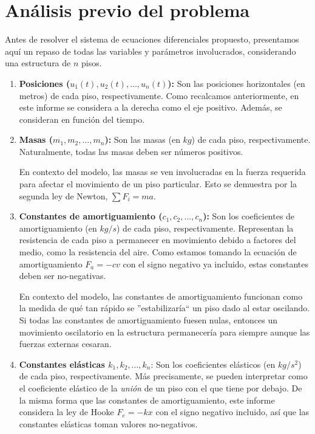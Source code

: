 \section{Análisis previo del problema}

Antes de resolver el sistema de ecuaciones diferenciales propuesto, presentamos aquí un repaso de todas las variables y parámetros involucrados, considerando una estructura de \(n\) pisos.

\begin{enumerate}
    \item \textbf{Posiciones (\(u_1(t), u_2(t), \ldots, u_n(t)\)):} Son las posiciones horizontales (en metros) de cada piso, respectivamente. Como recalcamos anteriormente, en este informe se considera a la derecha como el eje positivo. Además, se consideran en función del tiempo.

    \item \textbf{Masas (\(m_1, m_2, \ldots, m_n\)):} Son las masas (en \(\si{kg}\)) de cada piso, respectivamente. Naturalmente, todas las masas deben ser números positivos.

        En contexto del modelo, las masas se ven involucradas en la fuerza requerida para afectar el movimiento de un piso particular. Esto se demuestra por la segunda ley de Newton, \(\sum F_i = ma\).

    \item \textbf{Constantes de amortiguamiento (\(c_1, c_2, \ldots, c_n\)):} Son los coeficientes de amortiguamiento (en \(kg/s\)) de cada piso, respectivamente. Representan la resistencia de cada piso a permanecer en movimiento debido a factores del medio, como la resistencia del aire. Como estamos tomando la ecuación de amortiguamiento \(F_a = -cv\) con el signo negativo ya incluido, estas constantes deben ser no-negativas.

        En contexto del modelo, las constantes de amortiguamiento funcionan como la medida de qué tan rápido se ''estabilizaría`` un piso dado al estar oscilando. Si todas las constantes de amortiguamiento fuesen nulas, entonces un movimiento oscilatorio en la estructura permanecería para siempre aunque las fuerzas externas cesaran.

    \item \textbf{Constantes elásticas \(k_1, k_2, \ldots, k_n\)}: Son los coeficientes elásticos (en \(\si{kg/s^2}\)) de cada piso, respectivamente. Más precisamente, se pueden interpretar como el coeficiente elástico de la \textit{unión} de un piso con el que tiene por debajo. De la misma forma que las constantes de amortiguamiento, este informe considera la ley de Hooke \(F_e = -kx\) con el signo negativo incluido, así que las constantes elásticas toman valores no-negativos.


\end{enumerate}
